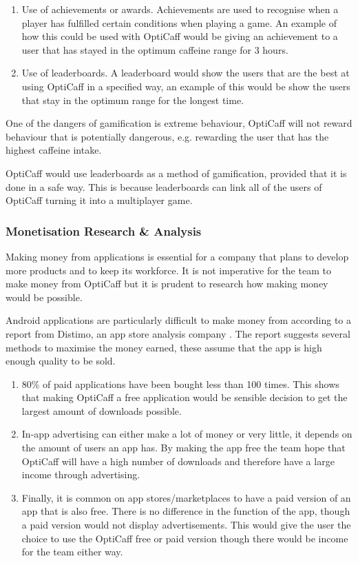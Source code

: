 \begin{enumerate}
	\item{Use of achievements or awards. Achievements are used to recognise when a player has fulfilled certain conditions when playing a game. An example of how this could be used with OptiCaff would be giving an achievement to a user that has stayed in the optimum caffeine range for 3 hours.}
	\item{Use of leaderboards. A leaderboard would show the users that are the best at using OptiCaff in a specified way, an example of this would be show the users that stay in the optimum range for the longest time.}
\end{enumerate}

One of the dangers of gamification is extreme behaviour, OptiCaff will not reward behaviour that is potentially dangerous, e.g. rewarding the user that has the highest caffeine intake.

OptiCaff would use leaderboards as a method of gamification, provided that it is done in a safe way. This is because leaderboards can link all of the users of OptiCaff turning it into a multiplayer game.

\subsubsection{Monetisation Research \& Analysis}
Making money from applications is essential for a company that plans to develop more products and to keep its workforce. It is not imperative for the team to make money from OptiCaff but it is prudent to research how making money would be possible.

Android applications are particularly difficult to make money from according to a report from Distimo, an app store analysis company \cite{monetisiation}. The report suggests several methods to maximise the money earned, these assume that the app is high enough quality to be sold.

\begin{enumerate}
	\item{80\% of paid applications have been bought less than 100 times. This shows that making OptiCaff a free application would be sensible decision to get the largest amount of downloads possible.}
	\item{In-app advertising can either make a lot of money or very little, it depends on the amount of users an app has. By making the app free the team hope that OptiCaff will have a high number of downloads and therefore have a large income through advertising.}
	\item{Finally, it is common on app stores/marketplaces to have a paid version of an app that is also free. There is no difference in the function of the app, though a paid version would not display advertisements. This would give the user the choice to use the OptiCaff free or paid version though there would be income for the team either way.}
\end{enumerate}

